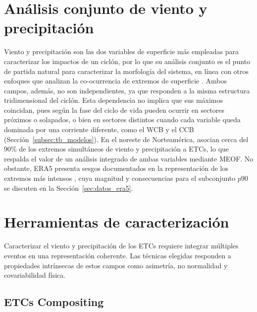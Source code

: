 \section{Análisis conjunto de viento y precipitación}\label{sec:tb_compound_def}
Viento y precipitación son las dos variables de superficie más empleadas para caracterizar los impactos de un ciclón, por lo que su análisis conjunto es el punto de partida natural para caracterizar la morfología del sistema, en línea con otros enfoques que analizan la co-ocurrencia de extremos de superficie \citep{zscheischler2018future}.
Ambos campos, además, no son independientes, ya que responden a la misma estructura tridimensional del ciclón.
Esta dependencia no implica que sus máximos coincidan, pues según la fase del ciclo de vida pueden ocurrir en sectores próximos o solapados, o bien en sectores distintos cuando cada variable queda dominada por una corriente diferente, como el WCB y el CCB (Sección~\ref{subsec:tb_modelos}).
En el noreste de Norteamérica, \citet{chen2025characteristics} asocian cerca del 90\% de los extremos simultáneos de viento y precipitación a ETCs, lo que respalda el valor de un análisis integrado de ambas variables mediante MEOF.
No obstante, ERA5 presenta sesgos documentados en la representación de los extremos más intensos \citep{chen2024evaluation}, cuya magnitud y consecuencias para el subconjunto $p90$ se discuten en la Sección~\ref{sec:datos_era5}.

\section{Herramientas de caracterización}\label{sec:tb_herramientas}
Caracterizar el viento y precipitación de los ETCs requiere integrar múltiples eventos en una representación coherente. 
Las técnicas elegidas responden a propiedades intrínsecas de estos campos como asimetría, no normalidad y covariabilidad física.

\subsection{ETCs Compositing}\label{subsec:tb_compositing}

